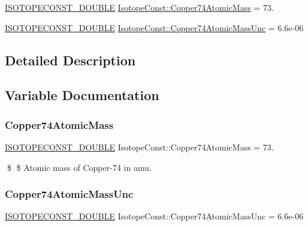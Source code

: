 \begin{DoxyCompactItemize}
\item 
\mbox{\hyperlink{group___isotope_const-_macros_ga8f45a7272ce02c0b4c65c44636ed719a}{I\+S\+O\+T\+O\+P\+E\+C\+O\+N\+S\+T\+\_\+\+D\+O\+U\+B\+LE}} \mbox{\hyperlink{group___isotope_const-_copper-_cu74_ga01f06f403945e977f67a0e75a594d80b}{Isotope\+Const\+::\+Copper74\+Atomic\+Mass}} = 73.
\item 
\mbox{\hyperlink{group___isotope_const-_macros_ga8f45a7272ce02c0b4c65c44636ed719a}{I\+S\+O\+T\+O\+P\+E\+C\+O\+N\+S\+T\+\_\+\+D\+O\+U\+B\+LE}} \mbox{\hyperlink{group___isotope_const-_copper-_cu74_ga8bbb1480f6c72adae51aa38f3a8a0591}{Isotope\+Const\+::\+Copper74\+Atomic\+Mass\+Unc}} = 6.\+6e-\/06
\end{DoxyCompactItemize}


\subsection{Detailed Description}


\subsection{Variable Documentation}
\mbox{\label{group___isotope_const-_copper-_cu74_ga01f06f403945e977f67a0e75a594d80b}} 
\subsubsection{\texorpdfstring{Copper74\+Atomic\+Mass}{Copper74AtomicMass}}
{\footnotesize\ttfamily \mbox{\hyperlink{group___isotope_const-_macros_ga8f45a7272ce02c0b4c65c44636ed719a}{I\+S\+O\+T\+O\+P\+E\+C\+O\+N\+S\+T\+\_\+\+D\+O\+U\+B\+LE}} Isotope\+Const\+::\+Copper74\+Atomic\+Mass = 73.}

\$ \$ Atomic mass of Copper-\/74 in amu. \mbox{\label{group___isotope_const-_copper-_cu74_ga8bbb1480f6c72adae51aa38f3a8a0591}} 
\subsubsection{\texorpdfstring{Copper74\+Atomic\+Mass\+Unc}{Copper74AtomicMassUnc}}
{\footnotesize\ttfamily \mbox{\hyperlink{group___isotope_const-_macros_ga8f45a7272ce02c0b4c65c44636ed719a}{I\+S\+O\+T\+O\+P\+E\+C\+O\+N\+S\+T\+\_\+\+D\+O\+U\+B\+LE}} Isotope\+Const\+::\+Copper74\+Atomic\+Mass\+Unc = 6.\+6e-\/06}

